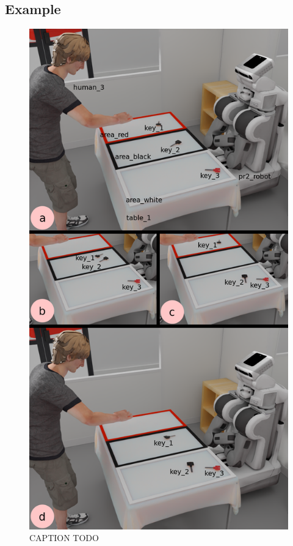 \documentclass[a4paper,11pt,twoside]{StyleThese}
\begin{document}
\subsection{Example}
\begin{figure}[hbtp]
\centering
\includegraphics[scale=0.3]{figures/chapter3/Chap3illustrative.png}
\caption{CAPTION TODO}
\label{fig:chap3keys}
\end{figure}
\end{document}
